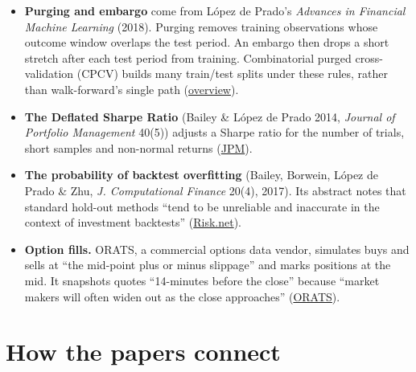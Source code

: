 \documentclass{article}
\begin{document}
\begin{itemize}

\item \textbf{Purging and embargo} come from López de Prado's \emph{Advances in Financial Machine Learning} (2018). Purging removes training observations whose outcome window overlaps the test period. An embargo then drops a short stretch after each test period from training. Combinatorial purged cross-validation (CPCV) builds many train/\allowbreak{}test splits under these rules, rather than walk-forward's single path (\href{https://en.wikipedia.org/wiki/Purged_cross-validation}{overview}).

\item \textbf{The Deflated Sharpe Ratio} (Bailey \& López de Prado 2014, \emph{Journal of Portfolio Management} 40(5)) adjusts a Sharpe ratio for the number of trials, short samples and non-normal returns (\href{https://jpm.pm-research.com/content/40/5/94.abstract}{JPM}).

\item \textbf{The probability of backtest overfitting} (Bailey, Borwein, López de Prado \& Zhu, \emph{J. Computational Finance} 20(4), 2017). Its abstract notes that standard hold-out methods ``tend to be unreliable and inaccurate in the context of investment backtests'' (\href{https://www.risk.net/journal-of-computational-finance/2471206/the-probability-of-backtest-overfitting}{Risk.net}).

\item \textbf{Option fills.} ORATS, a commercial options data vendor, simulates buys and sells at ``the mid-point plus or minus slippage'' and marks positions at the mid. It snapshots quotes ``14-minutes before the close'' because ``market makers will often widen out as the close approaches'' (\href{https://orats.com/blog/answers-to-common-questions-backtesting}{ORATS}).

\end{itemize}

\section{How the papers connect}
\end{document}
